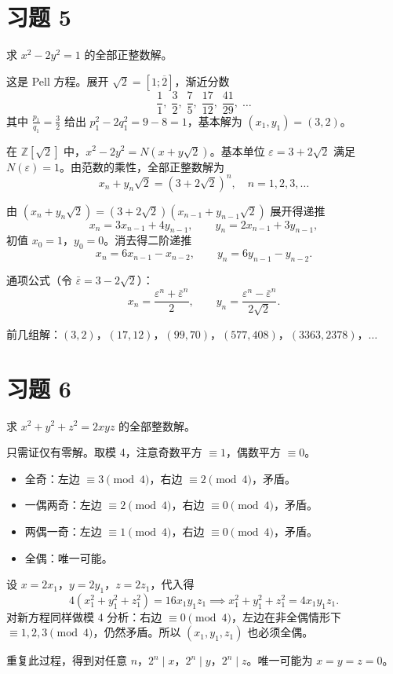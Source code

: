 \documentclass{article}
\begin{document}
\section{习题 5}

求 $x^2 - 2y^2 = 1$ 的全部正整数解。

\begin{solution}
  这是 Pell 方程。展开 $\sqrt{2} = [1; \overline{2}]$，渐近分数
  \[
    \frac{1}{1},\; \frac{3}{2},\; \frac{7}{5},\; \frac{17}{12},\; \frac{41}{29},\; \ldots
  \]
  其中 $\frac{p_1}{q_1} = \frac{3}{2}$ 给出 $p_1^2 - 2q_1^2 = 9 - 8 = 1$，基本解为 $(x_1, y_1) = (3, 2)$。

  在 $\mathbb{Z}[\sqrt{2}]$ 中，$x^2 - 2y^2 = N(x + y\sqrt{2})$。基本单位 $\varepsilon = 3 + 2\sqrt{2}$ 满足 $N(\varepsilon) = 1$。由范数的乘性，全部正整数解为
  \[
    x_n + y_n\sqrt{2} = (3 + 2\sqrt{2})^n, \quad n = 1, 2, 3, \ldots
  \]

  由 $(x_n + y_n\sqrt{2}) = (3 + 2\sqrt{2})(x_{n-1} + y_{n-1}\sqrt{2})$ 展开得递推
  \[
    x_n = 3x_{n-1} + 4y_{n-1}, \qquad y_n = 2x_{n-1} + 3y_{n-1},
  \]
  初值 $x_0 = 1$，$y_0 = 0$。消去得二阶递推
  \[
    x_n = 6x_{n-1} - x_{n-2}, \qquad y_n = 6y_{n-1} - y_{n-2}.
  \]

  通项公式（令 $\bar{\varepsilon} = 3 - 2\sqrt{2}$）：
  \[
    x_n = \frac{\varepsilon^n + \bar{\varepsilon}^n}{2}, \qquad
    y_n = \frac{\varepsilon^n - \bar{\varepsilon}^n}{2\sqrt{2}}.
  \]

  前几组解：$(3, 2)$，$(17, 12)$，$(99, 70)$，$(577, 408)$，$(3363, 2378)$，$\ldots$
\end{solution}

\section{习题 6}

求 $x^2 + y^2 + z^2 = 2xyz$ 的全部整数解。

\begin{solution}
  只需证仅有零解。取模 4，注意奇数平方 $\equiv 1$，偶数平方 $\equiv 0$。

  \begin{itemize}
    \item 全奇：左边 $\equiv 3 \pmod{4}$，右边 $\equiv 2 \pmod{4}$，矛盾。
    \item 一偶两奇：左边 $\equiv 2 \pmod{4}$，右边 $\equiv 0 \pmod{4}$，矛盾。
    \item 两偶一奇：左边 $\equiv 1 \pmod{4}$，右边 $\equiv 0 \pmod{4}$，矛盾。
    \item 全偶：唯一可能。
  \end{itemize}

  设 $x = 2x_1$，$y = 2y_1$，$z = 2z_1$，代入得
  \[
    4(x_1^2 + y_1^2 + z_1^2) = 16x_1 y_1 z_1 \implies x_1^2 + y_1^2 + z_1^2 = 4x_1 y_1 z_1.
  \]
  对新方程同样做模 4 分析：右边 $\equiv 0 \pmod{4}$，左边在非全偶情形下 $\equiv 1, 2, 3 \pmod{4}$，仍然矛盾。所以 $(x_1, y_1, z_1)$ 也必须全偶。

  重复此过程，得到对任意 $n$，$2^n \mid x$，$2^n \mid y$，$2^n \mid z$。唯一可能为 $x = y = z = 0$。
\end{solution}
\end{document}
